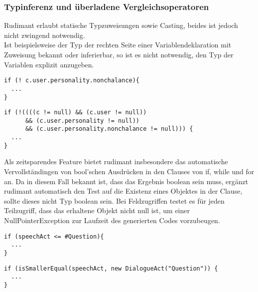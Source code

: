 \subsubsection{Typinferenz und überladene Vergleichsoperatoren} \label{rudimant-Typinferenz}

Rudimant erlaubt statische Typzuweisungen sowie Casting, beides ist jedoch nicht zwingend notwendig.\\
Ist beispielsweise der Typ der rechten Seite einer Variablendeklaration mit Zuweisung bekannt oder inferierbar, so ist es nicht notwendig, den Typ der Variablen explizit anzugeben.\\ \vspace*{10pt}
\begin{footnotesize}
\begin{minipage}{0.4\textwidth}
\begin{verbatim}
if (! c.user.personality.nonchalance){
  ...
}
\end{verbatim}
\end{minipage}
\begin{minipage}{0.6\textwidth}
\begin{verbatim}
if (!((((c != null) && (c.user != null))
      && (c.user.personality != null))
      && (c.user.personality.nonchalance != null))) {
  ...
}
\end{verbatim}
\end{minipage}
\end{footnotesize}
Als zeitsparendes Feature bietet rudimant insbesondere das automatische Vervollständingen von bool'schen Ausdrücken in den Clauses von if, while und for an. Da in diesem Fall bekannt ist, dass das Ergebnis boolean sein muss, ergänzt rudimant automatisch den Test auf die Existenz eines Objektes in der Clause, sollte dieses nicht Typ boolean sein. Bei Feldzugriffen testet es für jeden Teilzugriff, dass das erhaltene Objekt nicht null ist, um einer NullPointerException zur Laufzeit des generierten Codes vorzubeugen.\\
\vspace*{10pt}
\begin{footnotesize}
\begin{minipage}{0.4\textwidth}
\begin{verbatim}
if (speechAct <= #Question){
  ...
}
\end{verbatim}
\end{minipage}
\begin{minipage}{0.6\textwidth}
\begin{verbatim}
if (isSmallerEqual(speechAct, new DialogueAct("Question")) {
  ...
}
\end{verbatim}
\end{minipage}
\end{footnotesize}

